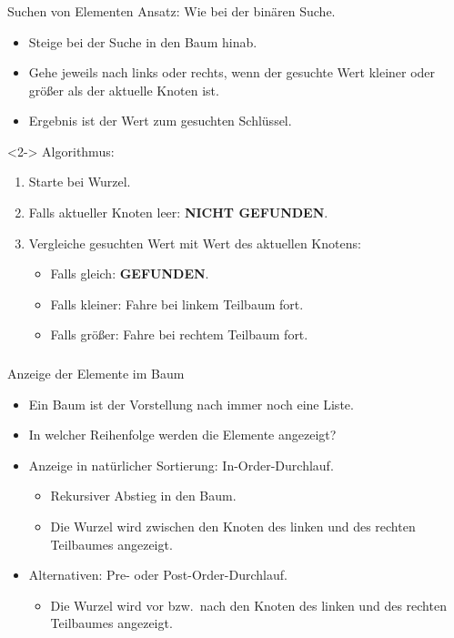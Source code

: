 \begin{frame}
\frametitle{\insertsection}
\begin{block}
{Suchen von Elementen}
Ansatz: Wie bei der binären Suche.
\begin{itemize}
	\item Steige bei der Suche in den Baum hinab.
	\item Gehe jeweils nach links oder rechts, wenn der gesuchte Wert kleiner oder größer
		als der aktuelle Knoten ist.
	\item Ergebnis ist der Wert zum gesuchten Schlüssel.
\end{itemize}
\end{block}
\begin{block}<2->
{Algorithmus:}
\begin{enumerate}
	\item Starte bei Wurzel.
	\item Falls aktueller Knoten leer: \alert{\textbf{NICHT GEFUNDEN}}.
	\item Vergleiche gesuchten Wert mit Wert des aktuellen Knotens:
	\begin{itemize}
		\item Falls gleich: \alert{\textbf{GEFUNDEN}}.
		\item Falls kleiner: Fahre bei linkem Teilbaum fort.
		\item Falls größer: Fahre bei rechtem Teilbaum fort.
	\end{itemize}
\end{enumerate}
\end{block}
\end{frame}


\begin{frame}
\frametitle{\insertsection}
\begin{block}
{Anzeige der Elemente im Baum}
\begin{itemize}
	\item Ein Baum ist der Vorstellung nach immer noch eine Liste.
	\item In welcher Reihenfolge werden die Elemente angezeigt?
	\item<2-> Anzeige in natürlicher Sortierung: \alert{In-Order-Durchlauf}.
	\begin{itemize}
		\item Rekursiver Abstieg in den Baum.
		\item Die Wurzel wird \alert{zwischen} den Knoten des linken und des rechten Teilbaumes angezeigt.
	\end{itemize}
	\item<3-> Alternativen: \alert{Pre-} oder \alert{Post-Order-Durchlauf}.
	\begin{itemize}
		\item Die Wurzel wird \alert{vor} bzw.\ \alert{nach} den Knoten des linken und des rechten Teilbaumes angezeigt.
	\end{itemize}
\end{itemize}
\end{block}
\end{frame}


